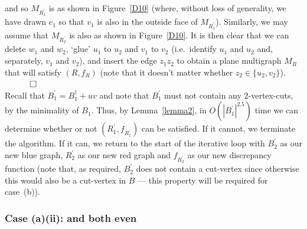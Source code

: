 \documentclass{article}
\newtheorem{Proof of Theorem}{Proof of Theorem}
\begin{document}
and so $M_{R_{1}^{\prime}}$ is as shown in Figure~\ref{D10}
(where, without loss of generality, 
we have drawn $e_{1}$ so that $v_{1}$ is also in the outside face of $M_{R_{1}^{\prime}}$).
Similarly, we may assume that $M_{R_{2}^{\prime}}$ is also as shown in Figure~\ref{D10}.
It is then clear that we can delete $w_{1}$ and $w_{2}$,
`glue' $u_{1}$ to $u_{2}$ and $v_{1}$ to $v_{2}$
(i.e.~identify $u_{1}$ and $u_{2}$ and, separately, $v_{1}$ and $v_{2}$),
and insert the edge $z_{1}z_{2}$  
to obtain a plane multigraph $M_{R}$ that will satisfy $(R,f_{R})$
(note that it doesn't matter whether $z_{2} \in \{ u_{2},v_{2} \}$).
$\phantom{qwerty}
\setlength{\unitlength}{.25cm}
\begin{picture}(1,1)
\put(0,0){\line(1,0){1}}
\put(0,0){\line(0,1){1}}
\put(1,1){\line(-1,0){1}}
\put(1,1){\line(0,-1){1}}
\end{picture}$ \\











Recall that $B_{1}^{\prime} = B_{1}^{\dag} + uv$ 
and note that $B_{1}^{\prime}$ must not contain any $2$-vertex-cuts, by the minimality of $B_{1}$.
Thus, by Lemma~\ref{lemma2},
in $O \left( |B_{1}^{\prime}|^{2.5} \right)$ time
we can determine whether or not $\left( R_{1}^{\prime},f_{R_{1}^{\prime}} \right)$ can be satisfied.
If it cannot, we terminate the algorithm.
If it can, we return to the start of the iterative loop with $B_{2}^{\prime}$ as our new blue graph,
$R_{2}^{\prime}$ as our new red graph and $f_{R_{2}^{\prime}}$ as our new discrepancy function
(note that, as required,
$B_{2}^{\prime}$ does not contain a cut-vertex
since otherwise this would also be a cut-vertex in $B$
--- this property will be required for case~(b)). 





\subsubsection*{Case (a)(ii): 
 and  both even}
\end{document}
